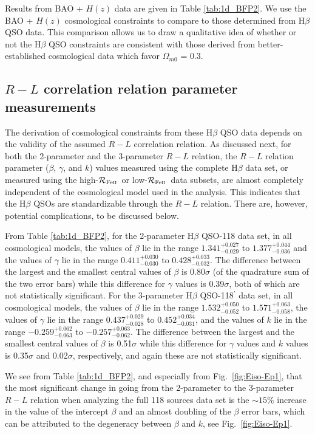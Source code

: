 \documentclass[a4paper,fleqn,usenatbib]{mnras}
\newcommand{\rfe}{${\cal R}_{\rm{Fe\textsc{ii}}}$}
\begin{document}
Results from BAO + $H(z)$ data are given in Table \ref{tab:1d_BFP2}. We use the BAO + $H(z)$ cosmological constraints to compare to those determined from H$\beta$ QSO data. This comparison allows us to draw a qualitative idea of whether or not the H$\beta$ QSO constraints  are consistent with those derived from better-established cosmological data which favor $\Omega_{m0}$ = 0.3. 

\subsection{$R-L$ correlation relation parameter measurements}

The derivation of cosmological constraints from these H$\beta$ QSO data depends on the validity of the assumed $R-L$ correlation relation. As discussed next, for both the 2-parameter and the 3-parameter $R-L$ relation, the $R-L$ relation parameter ($\beta$, $\gamma$, and $k$) values measured using the complete H$\beta$ data set, or measured using the high-\rfe\ or low-\rfe\ data subsets, are almost completely independent of the cosmological model used in the analysis. This indicates that the H$\beta$ QSOs are standardizable through the $R-L$ relation. There are, however, potential complications, to be discussed below.

From Table \ref{tab:1d_BFP2}, for the 2-parameter H$\beta$ QSO-118 data set, in all cosmological models, the values of $\beta$ lie in the range $1.341^{+0.027}_{-0.029}$ to $1.377^{+0.044}_{-0.036}$ and the values of $\gamma$ lie in the range $0.411^{+0.030}_{-0.030}$ to $0.428^{+0.033}_{-0.032}$. The difference between the largest and the smallest central values of $\beta$ is 0.80$\sigma$ (of the quadrature sum of the two error bars) while this difference for $\gamma$ values is 0.39$\sigma$, both of which are not statistically significant. For the 3-parameter H$\beta$ QSO-118$^{\prime}$ data set, in all cosmological models, the values of $\beta$ lie in the range $1.532^{+0.050}_{-0.052}$ to $1.571^{+0.063}_{-0.058}$, the values of $\gamma$ lie in the range $0.437^{+0.029}_{-0.028}$ to $0.452^{+0.034}_{-0.031}$, and the values of $k$ lie in the range $-0.259^{+0.062}_{-0.063}$ to $-0.257^{+0.063}_{-0.062}$. The difference between the largest and the smallest central values of $\beta$ is 0.51$\sigma$ while this difference for $\gamma$ values and $k$ values is 0.35$\sigma$ and 0.02$\sigma$, respectively, and again these are not statistically significant.

We see from Table \ref{tab:1d_BFP2}, and especially from Fig.\ \ref{fig:Eiso-Ep1}, that the most significant change in going from the 2-parameter to the 3-parameter $R-L$ relation when analyzing the full 118 sources data set is the $\sim 15$\% increase in the value of the intercept $\beta$ and an almost doubling of the $\beta$ error bars, which can be attributed to the degeneracy between $\beta$ and $k$, see Fig.~\ref{fig:Eiso-Ep1}.
\end{document}
